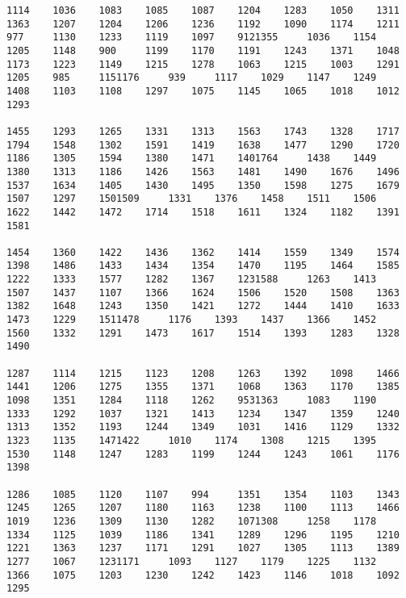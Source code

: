 \begin{verbatim}
1114    1036    1083    1085    1087    1204    1283    1050    1311    1363    1207    1204    1206    1236    1192    1090    1174    1211    977     1130    1233    1119    1097    9121355     1036    1154    1205    1148    900     1199    1170    1191    1243    1371    1048    1173    1223    1149    1215    1278    1063    1215    1003    1291    1205    985     1151176     939     1117    1029    1147    1249    1408    1103    1108    1297    1075    1145    1065    1018    1012    1293

1455    1293    1265    1331    1313    1563    1743    1328    1717    1794    1548    1302    1591    1419    1638    1477    1290    1720    1186    1305    1594    1380    1471    1401764     1438    1449    1380    1313    1186    1426    1563    1481    1490    1676    1496    1537    1634    1405    1430    1495    1350    1598    1275    1679    1507    1297    1501509     1331    1376    1458    1511    1506    1622    1442    1472    1714    1518    1611    1324    1182    1391    1581

1454    1360    1422    1436    1362    1414    1559    1349    1574    1398    1486    1433    1434    1354    1470    1195    1464    1585    1222    1333    1577    1282    1367    1231588     1263    1413    1507    1437    1107    1366    1624    1506    1520    1508    1363    1382    1648    1243    1350    1421    1272    1444    1410    1633    1473    1229    1511478     1176    1393    1437    1366    1452    1560    1332    1291    1473    1617    1514    1393    1283    1328    1490

1287    1114    1215    1123    1208    1263    1392    1098    1466    1441    1206    1275    1355    1371    1068    1363    1170    1385    1098    1351    1284    1118    1262    9531363     1083    1190    1333    1292    1037    1321    1413    1234    1347    1359    1240    1313    1352    1193    1244    1349    1031    1416    1129    1332    1323    1135    1471422     1010    1174    1308    1215    1395    1530    1148    1247    1283    1199    1244    1243    1061    1176    1398

1286    1085    1120    1107    994     1351    1354    1103    1343    1245    1265    1207    1180    1163    1238    1100    1113    1466    1019    1236    1309    1130    1282    1071308     1258    1178    1334    1125    1039    1186    1341    1289    1296    1195    1210    1221    1363    1237    1171    1291    1027    1305    1113    1389    1277    1067    1231171     1093    1127    1179    1225    1132    1366    1075    1203    1230    1242    1423    1146    1018    1092    1295


\end{verbatim}
